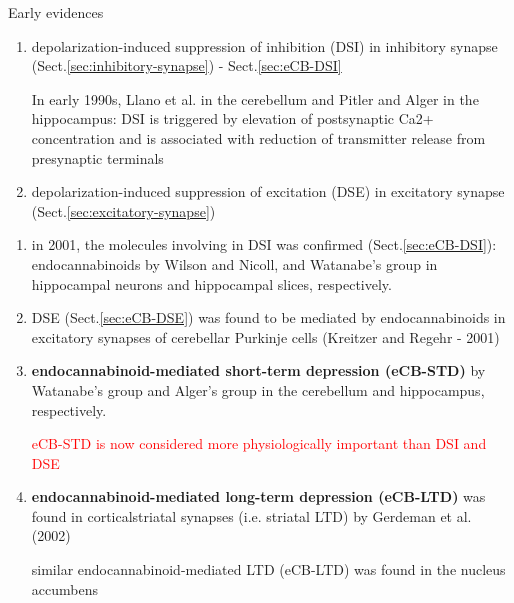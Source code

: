 Early evidences 
\begin{enumerate}
  \item depolarization-induced suppression of inhibition (DSI) in inhibitory
  synapse (Sect.\ref{sec:inhibitory-synapse}) - Sect.\ref{sec:eCB-DSI}
 
In early 1990s, Llano et al. in the cerebellum and Pitler and Alger in the
hippocampus: DSI is triggered by elevation of postsynaptic Ca2+ concentration
and is associated with reduction of transmitter release from presynaptic
terminals

  \item depolarization-induced suppression of excitation (DSE) in excitatory
  synapse (Sect.\ref{sec:excitatory-synapse})

\end{enumerate}

\begin{enumerate}

  \item  in 2001, the molecules involving in DSI was confirmed
  (Sect.\ref{sec:eCB-DSI}):
  endocannabinoids by Wilson and Nicoll, and Watanabe's group in hippocampal neurons and
  hippocampal slices, respectively.

  \item DSE (Sect.\ref{sec:eCB-DSE}) was found to be mediated by
  endocannabinoids in excitatory synapses of cerebellar Purkinje cells (Kreitzer
  and Regehr - 2001)

  \item {\bf endocannabinoid-mediated short-term depression (eCB-STD)}
by Watanabe's group and Alger's group in the cerebellum  and hippocampus, respectively.

\textcolor{red}{eCB-STD is now considered more physiologically important than
DSI and DSE}


   \item {\bf endocannabinoid-mediated long-term depression (eCB-LTD)}
   was found in corticalstriatal synapses (i.e. striatal LTD) by Gerdeman et al.
   (2002)
   
   similar endocannabinoid-mediated LTD (eCB-LTD) was found in the nucleus
   accumbens

   
\end{enumerate}

